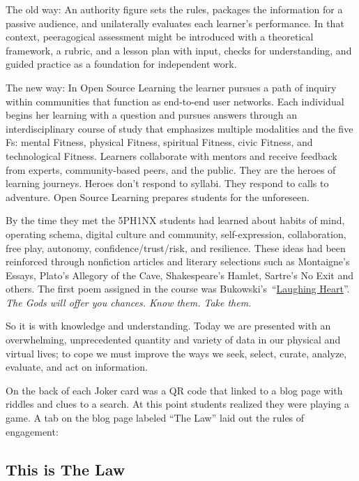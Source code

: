 The old way: An authority figure sets the rules, packages the
information for a passive audience, and unilaterally evaluates each
learner's performance. In that context, peeragogical assessment might be
introduced with a theoretical framework, a rubric, and a lesson plan
with input, checks for understanding, and guided practice as a
foundation for independent work.

The new way: In Open Source Learning the learner pursues a path of
inquiry within communities that function as end-to-end user networks.
Each individual begins her learning with a question and pursues answers
through an interdisciplinary course of study that emphasizes multiple
modalities and the five Fs: mental Fitness, physical Fitness, spiritual
Fitness, civic Fitness, and technological Fitness. Learners collaborate
with mentors and receive feedback from experts, community-based peers,
and the public. They are the heroes of learning journeys. Heroes don't
respond to syllabi. They respond to calls to adventure. Open Source
Learning prepares students for the unforeseen.

By the time they met the 5PH1NX students had learned about habits of
mind, operating schema, digital culture and community, self-expression,
collaboration, free play, autonomy, confidence/trust/risk, and
resilience. These ideas had been reinforced through nonfiction articles
and literary selections such as Montaigne's Essays, Plato's Allegory of
the Cave, Shakespeare's Hamlet, Sartre's No Exit and others. The first
poem assigned in the course was
Bukowski's~``\href{http://www.youtube.com/watch?v=bHOHi5ueo0A}{Laughing
Heart}''. \emph{The Gods will offer you chances. Know them. Take them.}

So it is with knowledge and understanding. Today we are presented with
an overwhelming, unprecedented quantity and variety of data in our
physical and virtual lives; to cope we must improve the ways we seek,
select, curate, analyze, evaluate, and act on information.

On the back of each Joker card was a QR code that linked to a blog page
with riddles and clues to a search. At this point students realized they
were playing a game. A tab on the blog page labeled ``The Law'' laid out
the rules of engagement:

\hypertarget{this-is-the-law}{%
\subsection{This is The Law}\label{this-is-the-law}}

